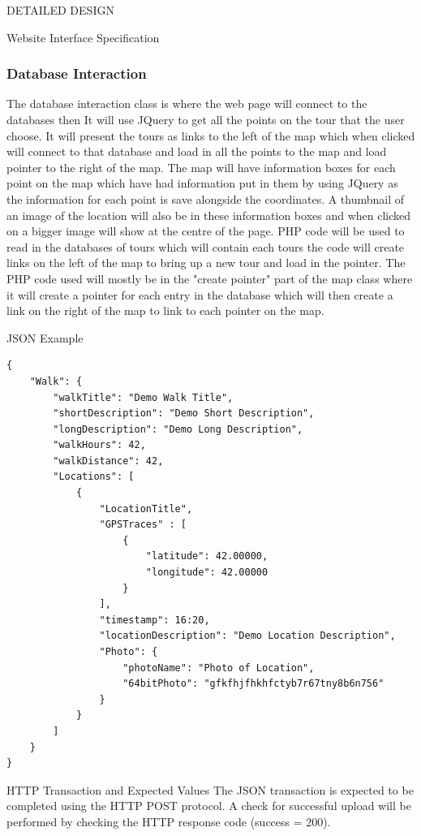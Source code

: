 \documentclass{article}
\begin{document}
\begin{section}{DETAILED DESIGN}
\begin{subsection}{Website Interface Specification}
		\subsubsection{Database Interaction}
			The database interaction class is where the web page will connect to the databases then It will use JQuery to get all the points on the tour that the user choose. It will present the tours as links to the left of the map which when clicked will connect to that database and load in all the points to the map and load pointer to the right of the map. The map will have information boxes for each point on the map which have had information put in them by using JQuery as the information for each point is save alongside the coordinates. A thumbnail of an image of the location will also be in these information boxes and when clicked on a bigger image will show at the centre of the page. PHP code will be used to read in the databases of tours which will contain each tours the code will create links on the left of the map to bring up a new tour and load in the pointer. The PHP code used will mostly be in the "create pointer" part of the map class where it will create a pointer for each entry in the database which will then create a link on the right of the map to link to each pointer on the map.
	\end{subsection}
	
		\clearpage
		\begin{subsection}{JSON Example}
			\begin{lstlisting}
{
	"Walk": {
		"walkTitle": "Demo Walk Title",
		"shortDescription": "Demo Short Description",
		"longDescription": "Demo Long Description",
		"walkHours": 42,
		"walkDistance": 42,
		"Locations": [
			{
				"LocationTitle",
				"GPSTraces" : [
					{
						"latitude": 42.00000,
						"longitude": 42.00000
					}
				],
				"timestamp": 16:20,
				"locationDescription": "Demo Location Description",
				"Photo": {
					"photoName": "Photo of Location",	
					"64bitPhoto": "gfkfhjfhkhfctyb7r67tny8b6n756"
				}
			}
		]
	}
}
			\end{lstlisting}
		\end{subsection}
		
		\begin{subsection}{HTTP Transaction and Expected Values}
			The JSON transaction is expected to be completed using the HTTP POST protocol. A check for successful upload will be performed by checking the HTTP response code (success = 200).
		\end{subsection}
\end{section}
\end{document}
